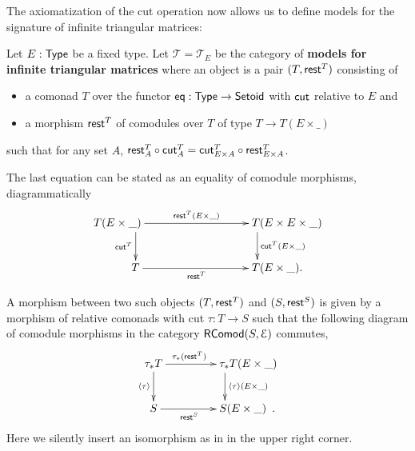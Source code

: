 \documentclass[a4paper,USenglish]{lipics}
\newcommand{\fat}[1]{\textbf{#1}}
\begin{document}
The axiomatization of the cut operation now allows us to define models for the signature of infinite triangular matrices:

\begin{defn}
\label{def:cat_tri}
   Let $E:\mathsf{Type}$ be a fixed type.
   Let $\mathcal{T} = \mathcal{T}_E$ be the category of \fat{models for infinite triangular matrices} where an object is a pair $(T,\mathsf{rest}^T)$ consisting of
   \begin{itemize}
    \item a comonad $T$ over the functor $\mathsf{eq}:\mathsf{Type}\to\mathsf{Setoid}$ with $\mathsf{cut}$ relative to $E$ and
    \item a morphism $\mathsf{rest}^T$ of comodules over $T$ of type $T \to T(E\times \_)$
   \end{itemize}
   such that for any set $A$,
    $ {\mathsf{rest}^T_A} \circ {\ensuremath{\mathsf{cut}}^T_A} = {\mathsf{cut}^T_{E\times A}} \circ {\ensuremath{\mathsf{rest}}^T_{E\times A}}$.
    
 \begin{Long}
   The last equation can be stated as an equality of comodule morphisms, diagrammatically
   \[
    \begin{xy}
     \xymatrix@C=5em{
                    **[l]  T(E\times \_) \ar[d]_{\cut^T} \ar[r]^-{\tail^T(E\times \_ )} & **[r] T(E \times E \times \_)  \ar[d]^{\cut^T(E\times\_)} \\
                     **[l] T \ar[r]_{\tail^T} & **[r] T (E\times \_).
     }
    \end{xy}
   \]

\end{Long}
  
   
   A morphism between two such objects $(T,\mathsf{rest}^T)$ and $(S,\mathsf{rest}^S)$
   is given by a morphism of relative comonads with cut $\tau : T \to S$ such that
   the following diagram of comodule morphisms in the category $\mathsf{RComod}(S,\mathcal{E})$ commutes,
   \begin{equation} \begin{xy}
       \xymatrix{   \tau_*T  \ar[r]^{\tau_*(\tail^T)} \ar[d]_{\induced{\tau}}  &  **[r] \tau_*T (E\times \_ )\ar[d]^{\induced{\tau}(E\times \_)} \\
                    S  \ar[r]_{\tail^S}  &  **[r] S (E\times \_ ) \enspace .
        }
      \end{xy}
      \label{eq:tri_model}
   \end{equation}
   Here we silently insert an isomorphism as in  in the upper right corner.
\end{defn}   
\end{document}
